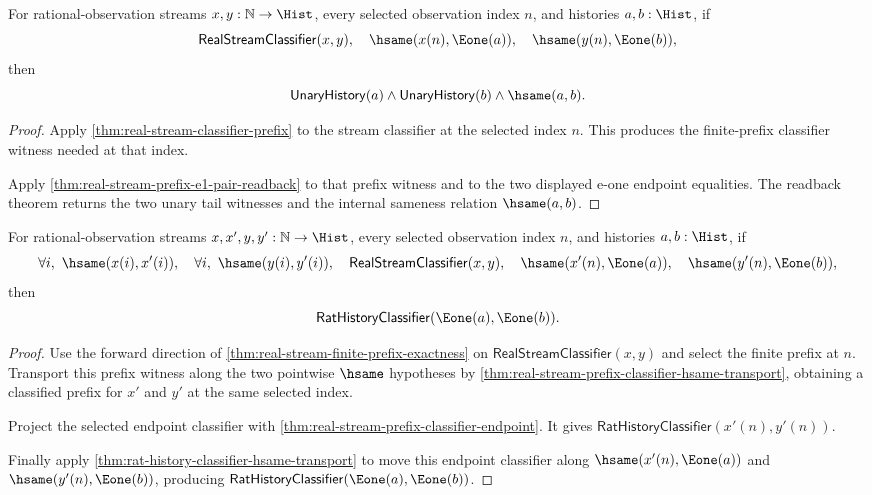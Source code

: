 \begin{theorem}
\label{thm:real-stream-classifier-selected-e1-pair-readback}
For rational-observation streams $x,y:\mathbb{N}\to\Hist$, every selected
observation index $n$, and histories $a,b:\Hist$, if
$$
\mathsf{RealStreamClassifier}(x,y),\quad
\hsame(x(n),\Eone(a)),\quad
\hsame(y(n),\Eone(b)),
$$
then
$$
\mathsf{UnaryHistory}(a)\land \mathsf{UnaryHistory}(b)\land \hsame(a,b).
$$
\end{theorem}
\begin{proof}
Apply \autoref{thm:real-stream-classifier-prefix} to the stream classifier at
the selected index $n$. This produces the finite-prefix classifier witness
needed at that index.

Apply \autoref{thm:real-stream-prefix-e1-pair-readback} to that prefix witness
and to the two displayed e-one endpoint equalities. The readback theorem returns
the two unary tail witnesses and the internal sameness relation
$\hsame(a,b)$.
\end{proof}

\begin{theorem}
\label{thm:real-stream-classifier-transported-selected-e1-rat-classifier-readback}
For rational-observation streams $x,x',y,y':\mathbb{N}\to\Hist$, every selected
observation index $n$, and histories $a,b:\Hist$, if
$$
\forall i,\ \hsame(x(i),x'(i)),\quad
\forall i,\ \hsame(y(i),y'(i)),\quad
\mathsf{RealStreamClassifier}(x,y),\quad
\hsame(x'(n),\Eone(a)),\quad
\hsame(y'(n),\Eone(b)),
$$
then
$$
\mathsf{RatHistoryClassifier}(\Eone(a),\Eone(b)).
$$
\end{theorem}
\begin{proof}
Use the forward direction of
\autoref{thm:real-stream-finite-prefix-exactness} on
$\mathsf{RealStreamClassifier}(x,y)$ and select the finite prefix at $n$.
Transport this prefix witness along the two pointwise $\hsame$ hypotheses by
\autoref{thm:real-stream-prefix-classifier-hsame-transport}, obtaining a
classified prefix for $x'$ and $y'$ at the same selected index.

Project the selected endpoint classifier with
\autoref{thm:real-stream-prefix-classifier-endpoint}. It gives
$\mathsf{RatHistoryClassifier}(x'(n),y'(n))$.

Finally apply \autoref{thm:rat-history-classifier-hsame-transport} to move this
endpoint classifier along $\hsame(x'(n),\Eone(a))$ and
$\hsame(y'(n),\Eone(b))$, producing
$\mathsf{RatHistoryClassifier}(\Eone(a),\Eone(b))$.
\end{proof}

